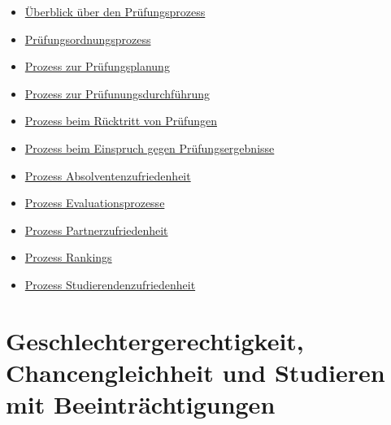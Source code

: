 \begin{itemize}
\tightlist
\item
  \href{https://th-koeln.github.io/mi-2017/anhaenge/Prozessbeschreibung_PruefungsprozessUeberblick.pdf}{Überblick
  über den Prüfungsprozess}
\item
  \href{https://th-koeln.github.io/mi-2017/anhaenge/Prozessbeschreibung_Pruefungsordnungsprozess.pdf}{Prüfungsordnungsprozess}
\item
  \href{https://th-koeln.github.io/mi-2017/anhaenge/Prozessbeschreibung_Pruefungplanung.pdf}{Prozess zur
  Prüfungsplanung}
\item
  \href{https://th-koeln.github.io/mi-2017/anhaenge/Prozessbeschreibung_Pruefungdurchfuehren.pdf}{Prozess
  zur Prüfunungsdurchführung}
\item
  \href{https://th-koeln.github.io/mi-2017/anhaenge/Prozessbeschreibung_vonPruefungzuruecktreten.pdf}{Prozess
  beim Rücktritt von Prüfungen}
\item
  \href{https://th-koeln.github.io/mi-2017/anhaenge/Prozessbeschreibung_EinspruchPruefungsergebnisse.pdf}{Prozess
  beim Einspruch gegen Prüfungsergebnisse}
\item
  \href{https://th-koeln.github.io/mi-2017/anhaenge/Prozessbeschreibung-Absolventenzufriedenheit.pdf}{Prozess
  Absolventenzufriedenheit}
\item
  \href{https://th-koeln.github.io/mi-2017/anhaenge/Prozessbeschreibung-Evaluationsprozesse.pdf}{Prozess
  Evaluationsprozesse}
\item
  \href{https://th-koeln.github.io/mi-2017/anhaenge/Prozessbeschreibung-Partnerzufriedenheit.pdf}{Prozess
  Partnerzufriedenheit}
\item
  \href{https://th-koeln.github.io/mi-2017/anhaenge/Prozessbeschreibung-Rankings.pdf}{Prozess Rankings}
\item
  \href{https://th-koeln.github.io/mi-2017/anhaenge/Prozessbeschreibung-Studierendenzufriedenheit.pdf}{Prozess
  Studierendenzufriedenheit}
\end{itemize}

\chapter{Geschlechtergerechtigkeit, Chancengleichheit und Studieren mit
Beeinträchtigungen\label{/mi-2017/selbstbericht/1100-geschlechtergerechtigkeit-und-chancengleichheit/0000-geschlechtergerechtigkeit-und-chancengleichheit}}\label{geschlechtergerechtigkeit-chancengleichheit-und-studieren-mit-beeintruxe4chtigungenpathlabelmi-2017selbstbericht1100-geschlechtergerechtigkeit-und-chancengleichheit0000-geschlechtergerechtigkeit-und-chancengleichheit}

